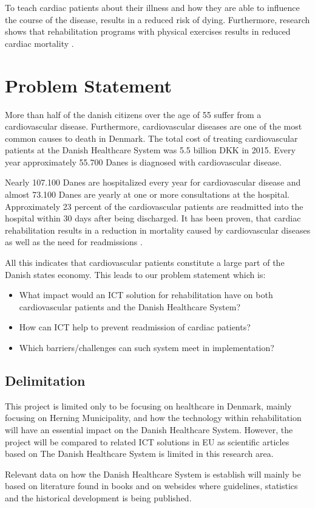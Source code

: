 To teach cardiac patients about their illness and how they are able to influence the course of the disease, results in a reduced risk of dying. Furthermore, research shows that rehabilitation programs with physical exercises results in reduced cardiac mortality \cite{Hjerteforening}.    
   

\section{Problem Statement}
More than half of the danish citizens over the age of 55 suffer from a cardiovascular disease. Furthermore, cardiovascular diseases are one of the most common causes to death in Denmark. The total cost of treating cardiovascular patients at the Danish Healthcare System was 5.5 billion DKK in 2015. Every year approximately 55.700 Danes is diagnosed with cardiovascular disease.   

Nearly 107.100 Danes are hospitalized every year for cardiovascular disease and almost 73.100 Danes are yearly at one or more consultations at the hospital. Approximately 23 percent of the cardiovascular patients are readmitted into the hospital within 30 days after being discharged. It has been proven, that cardiac rehabilitation results in a reduction in mortality caused by cardiovascular diseases as well as the need for readmissions \cite{Hjerteforening}.

All this indicates that cardiovascular patients constitute a large part of the Danish states economy. This leads to our problem statement which is:

\begin{itemize}
	\item What impact would an ICT solution for rehabilitation have on both cardiovascular patients and the Danish Healthcare System?
	\item How can ICT help to prevent readmission of cardiac patients?
	\item Which barriers/challenges can such system meet in implementation?
\end{itemize}

\subsection{Delimitation}
This project is limited only to be focusing on healthcare in Denmark, mainly focusing on Herning Municipality, and how the technology within rehabilitation will have an essential impact on the Danish Healthcare System. However, the project will be compared to related ICT solutions in EU as scientific articles based on The Danish Healthcare System is limited in this research area. 

Relevant data on how the Danish Healthcare System is establish will mainly be based on literature found in books and on websides where guidelines, statistics and the historical development is being published. 


